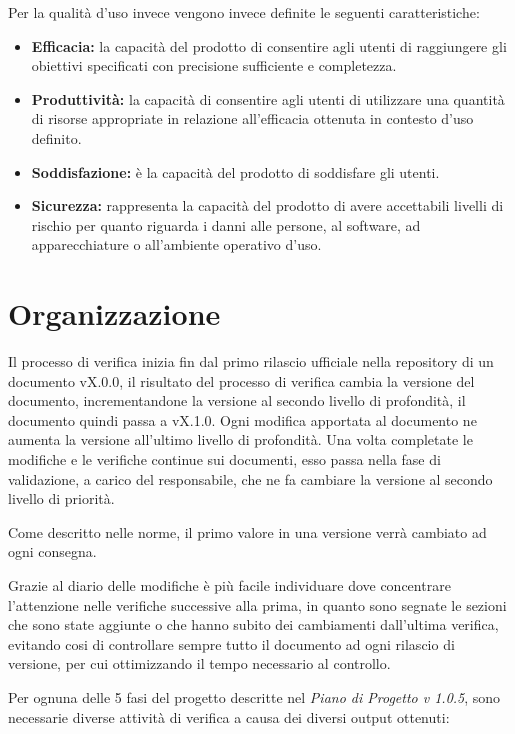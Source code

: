 \documentclass[a4paper]{report}
\begin{document}
				Per la qualità d'uso invece vengono invece definite le seguenti caratteristiche:
				\begin{itemize}
					\item \textbf{Efficacia:} la capacità del prodotto di consentire agli utenti di raggiungere gli obiettivi
					specificati con precisione sufficiente e completezza. 
					\item \textbf{Produttività:} la capacità di consentire agli utenti di utilizzare una quantità di risorse
					appropriate in relazione all'efficacia ottenuta in contesto d'uso definito. 
					\item \textbf{Soddisfazione:} è la capacità del prodotto di soddisfare gli utenti. 
					\item \textbf{Sicurezza:} rappresenta la capacità del prodotto di avere accettabili livelli di rischio per
					quanto riguarda i danni alle persone, al software, ad apparecchiature o all'ambiente operativo d'uso. 
				\end{itemize}
			
			
		\section{Organizzazione}
			Il processo di verifica inizia fin dal primo rilascio ufficiale nella repository di un documento vX.0.0, il risultato 
			del processo di verifica cambia la versione del documento, incrementandone la versione al secondo livello di profondità, 
			il documento quindi passa a vX.1.0. Ogni modifica apportata al documento ne aumenta la versione all'ultimo livello di 
			profondità. Una volta completate le modifiche e le verifiche continue sui documenti, esso passa nella fase di validazione,
			a carico del responsabile, che ne fa cambiare la versione al secondo livello di priorità. 
			
			Come descritto nelle norme, il primo valore in una versione verrà cambiato ad ogni consegna.
			
			Grazie al diario delle modifiche è più facile individuare dove concentrare l’attenzione nelle verifiche successive 
			alla prima, in quanto sono segnate le sezioni che sono state aggiunte o che hanno subito dei cambiamenti dall’ultima
			 verifica, evitando cosi di controllare sempre tutto il documento ad ogni rilascio di versione, per cui ottimizzando 
			 il tempo necessario al controllo.

			Per ognuna delle 5 fasi del progetto descritte nel \emph{Piano di Progetto v 1.0.5}, sono necessarie diverse attività 
			di verifica a causa dei diversi output ottenuti:
\end{document}

